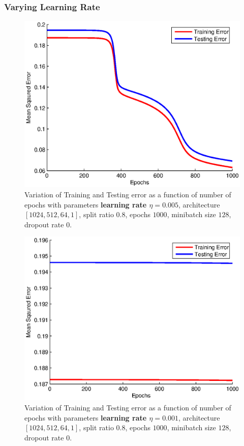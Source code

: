 \documentclass{article}
\newcommand{\myScale}{0.56}
\begin{document}
\subsubsection{Varying Learning Rate}
\begin{figure}[H]
\includegraphics[scale=\myScale]{../q2/part4_0p005}
\caption{Variation of Training and Testing error as a function of number of epochs with parameters {\bf learning rate $\eta=0.005$}, architecture $[1024,512,64,1]$, split ratio $0.8$, epochs $1000$, minibatch size $128$, dropout rate $0$.}
\label{fig:fig23}
\end{figure}
\begin{figure}[H]
\includegraphics[scale=\myScale]{../q2/part4_0p001}
\caption{Variation of Training and Testing error as a function of number of epochs with parameters {\bf learning rate $\eta=0.001$}, architecture $[1024,512,64,1]$, split ratio $0.8$, epochs $1000$, minibatch size $128$, dropout rate $0$.}
\label{fig:fig24}
\end{figure}
\end{document}
